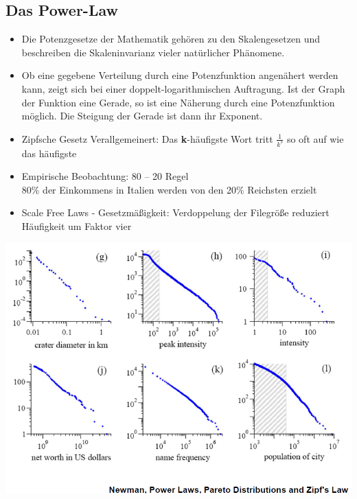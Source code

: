 \documentclass{article} %
\begin{document}
		\subsection{Das Power-Law}
	\begin{itemize}
		\item Die Potenzgesetze der Mathematik gehören zu den Skalengesetzen und beschreiben die Skaleninvarianz vieler natürlicher Phänomene.
		\item Ob eine gegebene Verteilung durch eine Potenzfunktion angenähert werden kann, zeigt sich bei einer doppelt-logarithmischen Auftragung. Ist der Graph der Funktion eine Gerade, so ist eine Näherung durch eine Potenzfunktion möglich. Die Steigung der Gerade ist dann ihr Exponent.
		\item Zipfsche Gesetz Verallgemeinert: Das \textbf{k}-häufigste Wort tritt $\frac{1}{k^{s}}$ so oft auf wie das häufigste
		\item Empirische Beobachtung: 80 – 20 Regel\\
		80\% der Einkommens in Italien werden von den 20\% Reichsten erzielt
		\item Scale Free Laws - Gesetzmäßigkeit: Verdoppelung der Filegröße reduziert Häufigkeit um Faktor vier 
		
	\end{itemize}
	\begin{center}
		\includegraphics[scale=0.5]{img/power.png}
	\end{center}
	
\end{document}
